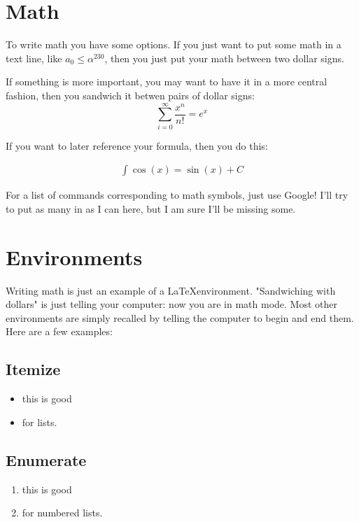 \documentclass[12pts]{article}
\newcommand{\La}{\LaTeX}
\begin{document}
\section {Math}

To write math you have some options. If you just want to put some math in a text line, like $a_0 \leq \alpha^{230}$, then you just put  your math between two dollar signs.

If something is more important, you may want to have it in a more central fashion, then you sandwich it betwen pairs of dollar signs:
$$
\sum_{i=0}^\infty  \frac{x^n}{n!}= e^x
$$

If you want to later reference your formula, then you do this:

\begin{eqnarray}
\int \cos(x) =  \sin(x) + C
\label{trigisboring}
\end{eqnarray}

For a list of commands corresponding to math symbols, just use Google! I'll try to put as many in as I can here, but I am sure I'll be missing some.

\section{Environments}

Writing math is just an example of a \La environment. "Sandwiching with dollars" is just telling your computer: now you are in math mode. Most other environments are  simply recalled by telling the computer to begin and end them. Here are a few examples:

\subsection{Itemize}

\begin{itemize}
	\item this is good
	\item for lists.
\end{itemize}

\subsection{Enumerate}

\begin{enumerate}
	\item this is good
	\item for numbered lists.
\end{enumerate}
\end{document}
